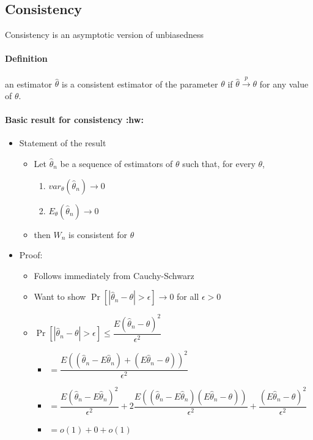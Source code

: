 \subsection{Consistency}
\label{sec-1-6}

     Consistency is an asymptotic version of unbiasedness
\paragraph{Definition}
\label{sec-1-6-1}

      an estimator $\hat \theta$ is a consistent estimator of the
      parameter $\theta$ if $\hat \theta \xrightarrow{p} \theta$ for
      any value of $\theta$.
\paragraph{Basic result for consistency \textbf{:hw:}}
\label{sec-1-6-2}

\begin{itemize}
\item Statement of the result
\begin{itemize}
\item Let $\hat\theta_n$ be a sequence of estimators of $\theta$ such
          that, for every $\theta$,
\begin{enumerate}
\item $var_\theta(\hat\theta_n) \to 0$
\item $E_\theta (\hat\theta_n) \to 0$
\end{enumerate}
\item then $W_n$ is consistent for $\theta$
\end{itemize}
\item Proof:
\begin{itemize}
\item Follows immediately from Cauchy-Schwarz
\item Want to show $\Pr[|\hat \theta_n - \theta| > \epsilon] \to 0$ for all $\epsilon > 0$
\item $\Pr[|\hat \theta_n - \theta| > \epsilon] \leq \dfrac{E(\hat\theta_n - \theta)^2}{\epsilon^2}$
\begin{itemize}
\item $= \dfrac{E((\hat\theta_n - E\hat\theta_n)+ (E\hat\theta_n - \theta))^2}{\epsilon^2}$
\item $= \dfrac{E(\hat\theta_n - E\hat\theta_n)^2}{\epsilon^2} + 2 \dfrac{E((\hat\theta_n - E\hat\theta_n)(E\hat\theta_n - \theta))}{\epsilon^2} + \dfrac{(E\hat\theta_n - \theta)^2}{\epsilon^2}$
\item $= o(1) + 0 + o(1)$
\end{itemize}
\end{itemize}
\end{itemize}
